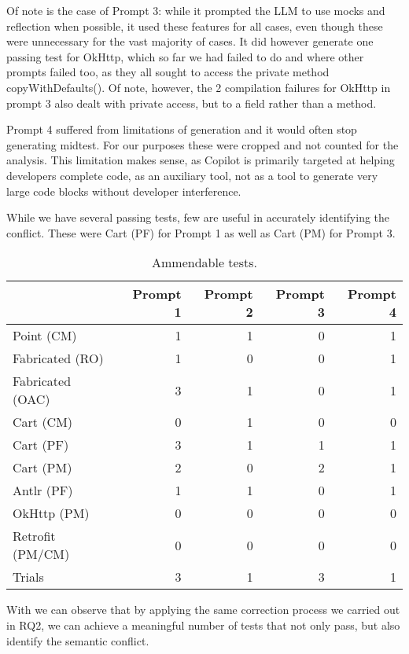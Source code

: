 Of note is the case of Prompt 3: while it prompted the LLM to use mocks and reflection when possible, it used these features
for all cases, even though these were unnecessary for the vast majority of cases. It did however generate one passing test for OkHttp,
which so far we had failed to do and where other prompts failed too, as they all sought to access the private method copyWithDefaults().
Of note, however, the 2 compilation failures for OkHttp in prompt 3 also dealt with private access, but to a field rather than a method.

Prompt 4 suffered from limitations of generation and it would often stop generating midtest. For our purposes these were cropped and not counted for the analysis.
This limitation makes sense, as Copilot is primarily targeted at helping developers complete code, as an auxiliary tool, not as a tool to generate very large
code blocks without developer interference.

While we have several passing tests, few are useful in accurately identifying the conflict.
These were Cart (PF) for Prompt 1 as well as Cart (PM) for Prompt 3.


\begin{table}[t]
    \centering
    \begin{tabular}{@{\extracolsep{\fill}} lrrrr} \toprule
                     & Prompt 1 & Prompt 2 & Prompt 3 & Prompt 4 \\
    \midrule
    Point (CM)       & 1 & 1 & 0 & 1 \\
    Fabricated (RO)  & 1 & 0 & 0 & 1 \\
    Fabricated (OAC) & 3 & 1 & 0 & 1 \\
    Cart (CM)        & 0 & 1 & 0 & 0 \\
    Cart (PF)        & 3 & 1 & 1 & 1 \\
    Cart (PM)        & 2 & 0 & 2 & 1 \\
    Antlr (PF)       & 1 & 1 & 0 & 1 \\
    OkHttp (PM)      & 0 & 0 & 0 & 0 \\
    Retrofit (PM/CM) & 0 & 0 & 0 & 0 \\
    Trials           & 3 & 1 & 3 & 1 \\
    \bottomrule
    \end{tabular}
    \caption{Ammendable tests.\label{tab:results:rq3t2}}
\end{table}

With  we can observe that by applying the same correction process we carried out in
RQ2, we can achieve a meaningful number of tests that not only pass, but also identify the semantic conflict.

